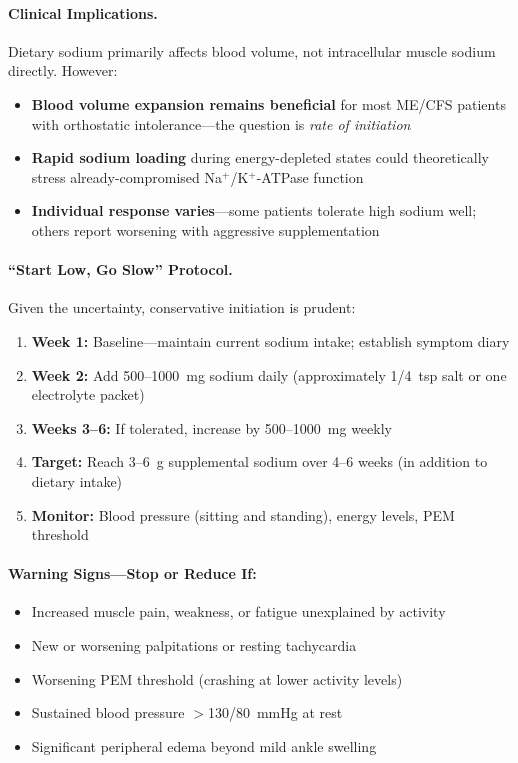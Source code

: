 \paragraph{Clinical Implications.}
Dietary sodium primarily affects blood volume, not intracellular muscle sodium directly. However:
\begin{itemize}
    \item \textbf{Blood volume expansion remains beneficial} for most ME/CFS patients with orthostatic intolerance---the question is \textit{rate of initiation}
    \item \textbf{Rapid sodium loading} during energy-depleted states could theoretically stress already-compromised Na$^+$/K$^+$-ATPase function
    \item \textbf{Individual response varies}---some patients tolerate high sodium well; others report worsening with aggressive supplementation
\end{itemize}

\paragraph{``Start Low, Go Slow'' Protocol.}
Given the uncertainty, conservative initiation is prudent:
\begin{enumerate}
    \item \textbf{Week 1:} Baseline---maintain current sodium intake; establish symptom diary
    \item \textbf{Week 2:} Add 500--1000~mg sodium daily (approximately 1/4~tsp salt or one electrolyte packet)
    \item \textbf{Weeks 3--6:} If tolerated, increase by 500--1000~mg weekly
    \item \textbf{Target:} Reach 3--6~g supplemental sodium over 4--6 weeks (in addition to dietary intake)
    \item \textbf{Monitor:} Blood pressure (sitting and standing), energy levels, PEM threshold
\end{enumerate}

\paragraph{Warning Signs---Stop or Reduce If:}
\begin{itemize}
    \item Increased muscle pain, weakness, or fatigue unexplained by activity
    \item New or worsening palpitations or resting tachycardia
    \item Worsening PEM threshold (crashing at lower activity levels)
    \item Sustained blood pressure $>$130/80~mmHg at rest~\cite{Stock2022sodium}
    \item Significant peripheral edema beyond mild ankle swelling
\end{itemize}

